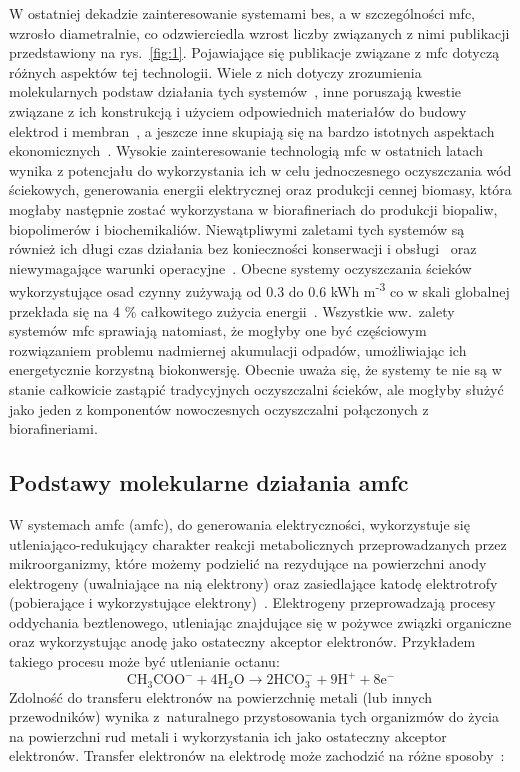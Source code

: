 W ostatniej dekadzie zainteresowanie systemami \acrshort{bes},
a w szczególności \acrshort{mfc}, wzrosło diametralnie, co odzwierciedla wzrost
liczby związanych z nimi publikacji przedstawiony na rys.~\ref{fig:1}.
Pojawiające się publikacje związane z \acrshort{mfc}
dotyczą różnych aspektów tej technologii.
Wiele z nich dotyczy zrozumienia molekularnych podstaw
działania tych systemów~\cite{Slate2019, Bruce2006, Lovley2006}, inne
poruszają kwestie związane z ich konstrukcją i użyciem odpowiednich
materiałów do budowy elektrod i membran~\cite{Kaur2020, Daud2015},
a jeszcze inne skupiają się na bardzo istotnych
aspektach ekonomicznych~\cite{Trapero2017}.
Wysokie zainteresowanie technologią \acrshort{mfc} w ostatnich latach wynika
z potencjału do wykorzystania ich w celu jednoczesnego oczyszczania
wód ściekowych, generowania energii elektrycznej oraz produkcji cennej biomasy,
która mogłaby następnie zostać wykorzystana w biorafineriach do produkcji
biopaliw, biopolimerów i biochemikaliów.
Niewątpliwymi zaletami tych systemów są również ich długi czas działania
bez konieczności konserwacji i obsługi~\cite{Habermann1991}
oraz niewymagające warunki operacyjne~\cite{Slate2019}.
Obecne systemy oczyszczania ścieków wykorzystujące osad czynny
zużywają od 0.3 do 0.6 kWh m\textsuperscript{-3} co w skali globalnej
przekłada się na 4 \% całkowitego zużycia energii~\cite{AlSayed2020}.
Wszystkie ww.\ zalety systemów \acrshort{mfc} sprawiają natomiast, że mogłyby one
być częściowym rozwiązaniem problemu nadmiernej akumulacji odpadów,
umożliwiając ich energetycznie korzystną biokonwersję.
Obecnie uważa się, że systemy te nie są w stanie całkowicie zastąpić
tradycyjnych oczyszczalni ścieków, ale mogłyby służyć
jako jeden z komponentów nowoczesnych oczyszczalni połączonych
z biorafineriami.

\subsection{Podstawy molekularne działania \acrshort{amfc}}\label{subsec:podstawy-molekularne}
W systemach \acrshort{amfc} (\acrlong{amfc}), do generowania elektryczności, wykorzystuje się
utleniająco-redukujący charakter reakcji metabolicznych
przeprowadzanych przez mikroorganizmy, które możemy podzielić
na rezydujące na powierzchni anody elektrogeny (uwalniające na nią
elektrony) oraz zasiedlające katodę elektrotrofy
(pobierające i wykorzystujące elektrony)~\cite{AlSayed2020}.
Elektrogeny przeprowadzają procesy oddychania beztlenowego,
utleniając znajdujące się w pożywce związki organiczne oraz
wykorzystując anodę jako ostateczny akceptor elektronów.
Przykładem takiego procesu może być utlenianie octanu:
\begin{equation}
    \label{eq:1}
    \mathrm{CH_3 COO^- + 4H_2 O \rightarrow 2HCO_3^- + 9H^+ + 8e^-}
\end{equation}
Zdolność do transferu elektronów na powierzchnię metali (lub
innych przewodników) wynika z~naturalnego przystosowania tych
organizmów do życia na powierzchni rud metali i wykorzystania
ich jako ostateczny akceptor elektronów.
Transfer elektronów na elektrodę może zachodzić na różne
sposoby~\cite{Santoro2017}:

